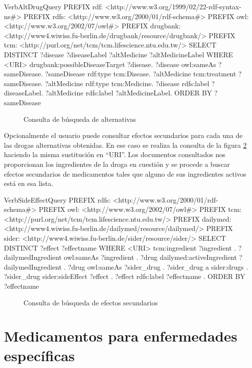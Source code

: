 \documentclass{article}
\begin{document}
\begin{SaveVerbatim}{VerbAltDrugQuery}
PREFIX rdf:  <http://www.w3.org/1999/02/22-rdf-syntax-ns#>
PREFIX rdfs: <http://www.w3.org/2000/01/rdf-schema#>
PREFIX owl:  <http://www.w3.org/2002/07/owl#>
PREFIX drugbank: <http://www4.wiwiss.fu-berlin.de/drugbank/resource/drugbank/>
PREFIX tcm:      <http://purl.org/net/tcm/tcm.lifescience.ntu.edu.tw/>
SELECT DISTINCT ?disease ?diseaseLabel ?altMedicine ?altMedicineLabel WHERE {
  <URI> drugbank:possibleDiseaseTarget ?disease.
  ?disease owl:sameAs ?sameDisease.
  ?sameDisease rdf:type tcm:Disease.
  ?altMedicine tcm:treatment ?sameDisease.
  ?altMedicine rdf:type tcm:Medicine.
  ?disease rdfs:label ?diseaseLabel.
  ?altMedicine rdfs:label ?altMedicineLabel.
}
ORDER BY ?sameDisease
\end{SaveVerbatim}

\begin{figure}[htbp]
 \fbox
 {
  \begin{minipage}{\textwidth}
   \caption{Consulta de búsqueda de alternativas}
   \label{src:AltDrugQuery}
  \end{minipage}
 }
\end{figure}

Opcionalmente el usuario puede consultar efectos secundarios para cada una de
las drogas alternativas obtenidas. En ese caso se realiza la consulta de la
figura \ref{src:SideEffectQuery} haciendo la misma sustitución en ``URI''. Los
documentos consultados nos proporcionan los ingredientes de la droga en
cuestión y se procede a buscar efectos secundarios de medicamentos tales que
alguno de sus ingredientes activos está en esa lista.

\begin{SaveVerbatim}{VerbSideEffectQuery}
PREFIX rdfs: <http://www.w3.org/2000/01/rdf-schema#>
PREFIX owl:  <http://www.w3.org/2002/07/owl#>
PREFIX tcm:      <http://purl.org/net/tcm/tcm.lifescience.ntu.edu.tw/>
PREFIX dailymed: <http://www4.wiwiss.fu-berlin.de/dailymed/resource/dailymed/>
PREFIX sider:    <http://www4.wiwiss.fu-berlin.de/sider/resource/sider/>
SELECT DISTINCT ?effect ?effectname WHERE {
        <URI> tcm:ingredient ?ingredient .
        ?dailymedIngredient owl:sameAs ?ingredient .
        ?drug dailymed:activeIngredient ?dailymedIngredient .
        ?drug owl:sameAs ?sider_drug .
        ?sider_drug a sider:drugs .
        ?sider_drug sider:sideEffect ?effect .
        ?effect rdfs:label ?effectname .
}
ORDER BY ?effectname
\end{SaveVerbatim}

\begin{figure}[htbp]
 \fbox
 {
  \begin{minipage}{\textwidth}
   \caption{Consulta de búsqueda de efectos secundarios}
   \label{src:SideEffectQuery}
  \end{minipage}
 }
\end{figure}

\section{Medicamentos para enfermedades específicas}
\end{document}
